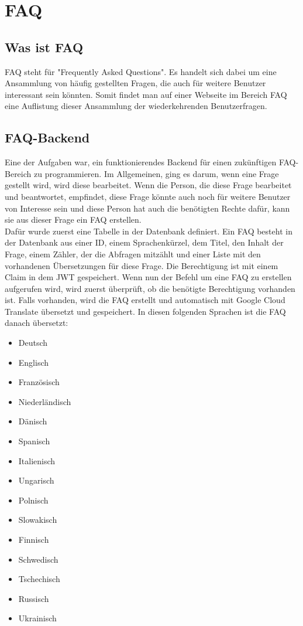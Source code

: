 \chapter{FAQ}
\section{Was ist FAQ}
FAQ steht für "Frequently Asked Questions". Es handelt sich dabei um eine Ansammlung von häufig gestellten Fragen, die auch für weitere Benutzer interessant sein könnten. Somit findet man auf einer Webseite im Bereich FAQ eine Auflistung dieser Ansammlung der wiederkehrenden Benutzerfragen.
\section{FAQ-Backend}
Eine der Aufgaben war, ein funktionierendes Backend für einen zukünftigen FAQ-Bereich zu programmieren. Im Allgemeinen, ging es darum, wenn eine Frage gestellt wird, wird diese bearbeitet. Wenn die Person, die diese Frage bearbeitet und beantwortet, empfindet, diese Frage könnte auch noch für weitere Benutzer von Interesse sein und diese Person hat auch die benötigten Rechte dafür, kann sie aus dieser Frage ein FAQ erstellen.\\
Dafür wurde zuerst eine Tabelle in der Datenbank definiert. Ein FAQ besteht in der Datenbank aus einer ID, einem Sprachenkürzel, dem Titel, den Inhalt der Frage, einem Zähler, der die Abfragen mitzählt und einer Liste mit den vorhandenen Übersetzungen für diese Frage. Die Berechtigung ist mit einem Claim in dem JWT gespeichert. Wenn nun der Befehl um eine FAQ zu erstellen aufgerufen wird, wird zuerst überprüft, ob die benötigte Berechtigung vorhanden ist. Falls vorhanden, wird die FAQ erstellt und automatisch mit Google Cloud Translate übersetzt und gespeichert. In diesen folgenden Sprachen ist die FAQ danach übersetzt:
\begin{multicols}{2}
\begin{itemize}
	\item Deutsch
	\item Englisch
	\item Französisch
	\item Niederländisch
	\item Dänisch
	\item Spanisch
	\item Italienisch
	\item Ungarisch
	\item Polnisch
	\item Slowakisch
	\item Finnisch
	\item Schwedisch
	\item Tschechisch
	\item Russisch
	\item Ukrainisch
\end{itemize}
\end{multicols}